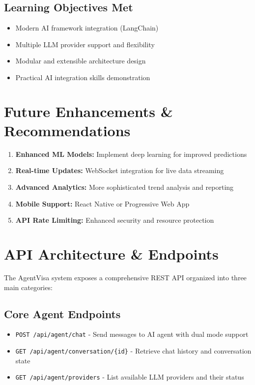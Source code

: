 \documentclass[11pt,a4paper]{article}
\newcommand{\greencheck}{\textcolor{successgreen}{\checkmark}}
\newcommand{\code}[1]{\texttt{#1}}
\begin{document}
\subsection{Learning Objectives Met}
\begin{itemize}[itemsep=0.3em]
    \item[\greencheck] Modern AI framework integration (LangChain)
    \item[\greencheck] Multiple LLM provider support and flexibility
    \item[\greencheck] Modular and extensible architecture design
    \item[\greencheck] Practical AI integration skills demonstration
\end{itemize}

\newpage
\section{Future Enhancements \& Recommendations}

\begin{enumerate}[itemsep=0.4em]
    \item \textbf{Enhanced ML Models:} Implement deep learning for improved predictions
    \item \textbf{Real-time Updates:} WebSocket integration for live data streaming
    \item \textbf{Advanced Analytics:} More sophisticated trend analysis and reporting
    \item \textbf{Mobile Support:} React Native or Progressive Web App
    \item \textbf{API Rate Limiting:} Enhanced security and resource protection
\end{enumerate}

\newpage
\section{API Architecture \& Endpoints}

The AgentVisa system exposes a comprehensive REST API organized into three main categories:

\subsection{Core Agent Endpoints}
\begin{itemize}[itemsep=0.3em]
    \item \code{POST /api/agent/chat} - Send messages to AI agent with dual mode support
    \item \code{GET /api/agent/conversation/\{id\}} - Retrieve chat history and conversation state
    \item \code{GET /api/agent/providers} - List available LLM providers and their status
\end{itemize}
\end{document}
